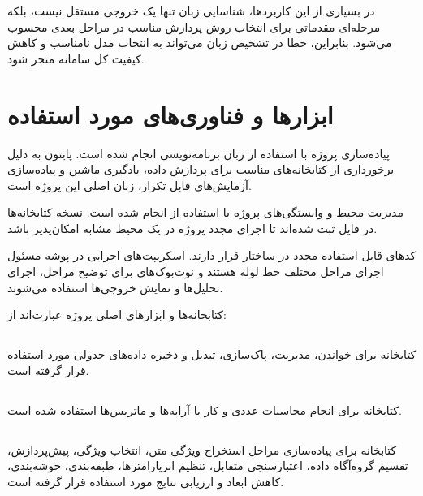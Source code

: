 \documentclass[12pt,a4paper,oneside]{report}
\begin{document}
در بسیاری از این کاربردها، شناسایی زبان تنها یک خروجی مستقل نیست، بلکه مرحله‌ای مقدماتی برای انتخاب روش پردازش مناسب در مراحل بعدی محسوب می‌شود. بنابراین، خطا در تشخیص زبان می‌تواند به انتخاب مدل نامناسب و کاهش کیفیت کل سامانه منجر شود.


\section{ابزارها و فناوری‌های مورد استفاده}

پیاده‌سازی پروژه با استفاده از زبان برنامه‌نویسی
انجام شده است. پایتون به دلیل برخورداری از کتابخانه‌های مناسب برای پردازش داده، یادگیری ماشین و پیاده‌سازی آزمایش‌های قابل تکرار، زبان اصلی این پروژه است.

مدیریت محیط و وابستگی‌های پروژه با استفاده از
انجام شده است. نسخه کتابخانه‌ها در فایل
ثبت شده‌اند تا اجرای مجدد پروژه در یک محیط مشابه امکان‌پذیر باشد.

کدهای قابل استفاده مجدد در ساختار
قرار دارند. اسکریپت‌های اجرایی در پوشه
مسئول اجرای مراحل مختلف خط لوله هستند و نوت‌بوک‌های
برای توضیح مراحل، اجرای تحلیل‌ها و نمایش خروجی‌ها استفاده می‌شوند.

کتابخانه‌ها و ابزارهای اصلی پروژه عبارت‌اند از:


\subsection*{}

کتابخانه
برای خواندن، مدیریت، پاک‌سازی، تبدیل و ذخیره داده‌های جدولی مورد استفاده قرار گرفته است.


\subsection*{}

کتابخانه
برای انجام محاسبات عددی و کار با آرایه‌ها و ماتریس‌ها استفاده شده است.


\subsection*{}

کتابخانه
برای پیاده‌سازی مراحل استخراج ویژگی متن، انتخاب ویژگی، پیش‌پردازش، تقسیم گروه‌آگاه داده، اعتبارسنجی متقابل، تنظیم ابرپارامترها، طبقه‌بندی، خوشه‌بندی، کاهش ابعاد و ارزیابی نتایج مورد استفاده قرار گرفته است.
\end{document}
